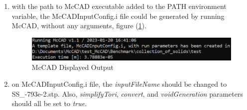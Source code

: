 \documentclass[12pt, a4paper, titlepage]{article}
\begin{document}
\begin{enumerate}
  \item with the path to McCAD executable added to the PATH environment variable, the McCADInputConfig.i file could be generated by running McCAD, without any arguments, figure (\ref{fig:McCAD_output}).
  \begin{figure}[h!]
  	\centering
  	\includegraphics[scale=0.75]{figures/McCAD_output.png}
  	\caption{McCAD Displayed Output}
  	\label{fig:McCAD_output}
  \end{figure}

  \item on McCADInputConfig.i file, the \emph{inputFileName} should be changed to SS\_-793e-2.stp. Also, \emph{simplifyTori}, \emph{convert}, and \emph{voidGeneration} parameters should all be set to \emph{true}.
  

\end{enumerate}
\end{document}
